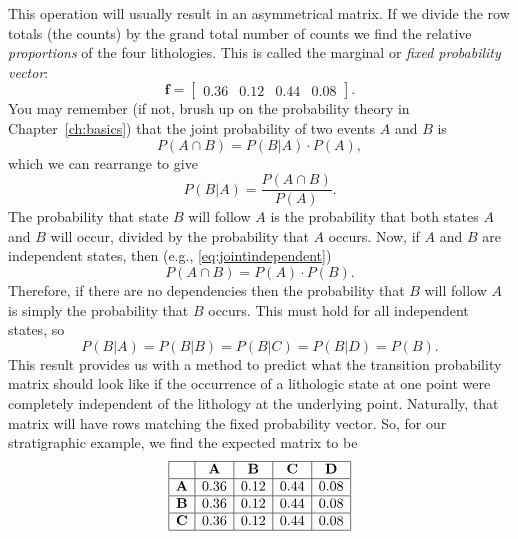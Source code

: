 \begin{example}
This operation will usually result in an asymmetrical matrix.  If we divide the row totals (the 
counts) by the grand total number of counts we find the relative \emph{proportions} of the four lithologies.  
This is called the marginal or \emph{fixed probability vector}:
\begin{equation}
\mathbf{f} = 
\left [ \begin{array}{cccc}
0.36 & 0.12 & 0.44 & 0.08
\end{array}
\right ].
\end{equation}
You may remember (if not, brush up on the probability theory in Chapter~\ref{ch:basics}) that the joint probability of two events 
$A$ and $B$ is
\begin{equation}
P(A \cap B) = P(B|A)\cdot P(A),
\end{equation}
which we can rearrange to give
\begin{equation}
P(B|A) = \frac{P(A \cap B)}{P(A)}.
\end{equation}
The probability that state $B$ will follow $A$ is the probability that both states $A$ and $B$ will occur,
divided by the probability that $A$ occurs.  Now, if $A$ and $B$ are independent states, then (e.g., \ref{eq:jointindependent})
\begin{equation}
P(A \cap B) = P(A) \cdot P(B).
\end{equation}
Therefore, if there are no dependencies then the probability that $B$ will follow $A$ is simply the 
probability that $B$ occurs.  This must hold for all independent states, so
\begin{equation}
P(B|A) = P(B|B)  = P(B|C) = P(B|D) = P(B).
\end{equation}
This result provides us with a method to predict what the transition probability matrix should look 
like if the occurrence of a lithologic state at one point were completely independent of the 
lithology at the underlying point.  Naturally, that matrix will have rows matching the fixed 
probability vector.  So, for our stratigraphic example, we find the expected matrix to be
$$
\begin{array}
{|c|c|c|c|c|} \hline
 & \bf{A} & \bf{B} & \bf{C} & \bf{D} \\ \hline
\bf{A} & 0.36 & 0.12 & 0.44 & 0.08  \\ \hline
\bf{B} & 0.36 & 0.12 & 0.44 & 0.08 \\ \hline
\bf{C} & 0.36 & 0.12 & 0.44 &  0.08 \\ \hline

\end{array}$$
\end{example}

